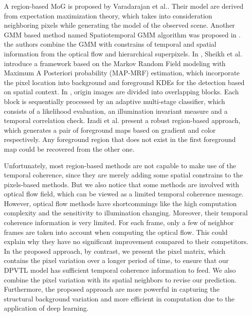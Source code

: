 \documentclass[journal]{IEEEtran}
\begin{document}
A region-based MoG is proposed by Varadarajan et al.\cite{2015_PR_Varadarajan20153488}. Their model are derived from expectation maximization theory, which takes into consideration neighboring pixels while generating the model of the observed scene.
%
Another GMM based method named Spatiotemporal GMM algorithm was proposed in \cite{2017_TPAMI_GANGWANG}. the authors combine the GMM with constrains of temporal and spatial information from the optical flow and hierarchical superpixels.
In \cite{Sheikh2005Bayesian}, Sheikh et al. introduce a framework based on the Markov Random Field modeling with Maximum A Posteriori 
probability (MAP-MRF) estimation, which incorporate the pixel location into background and foreground KDEs for the detection based on spatial context.
In \cite{Reddy2010Robust}, origin images are divided into overlapping blocks. Each block is sequentially processed by an adaptive multi-stage classifier, which consists of a likelihood evaluation, an illumination invariant measure and a temporal correlation check.
Izadi et al.\cite{Izadi2008Robust} present a robust region-based approach, which generates a pair of foreground maps based on gradient and color respectively. Any foreground region that does not exist in the first foreground map could be recovered from the other one.

Unfortunately, most region-based methods are not capable to make use of the temporal coherence, since they are merely adding some spatial constrains to the pixels-based methods. 
But we also notice that some methods are involved with optical flow field, which can be viewed as a limited temporal coherence message. 
However, optical flow methods have shortcommings like the high computation complexity and the sensitivity to illumination changing. 
Moreover, their temporal coherence information is very limited. For each frame, only a few of neighbor frames are taken into account when computing the optical flow.
This could explain why they have no significant improvement compared to their competitors.    
In the proposed approach, by contrast, we present the pixel matrix, which contains the pixel variation over a longer period of time, to ensure that our DPVTL model has sufficient temporal coherence information to feed.
We also combine the pixel variation with its spatial neighbors to revise our prediction.
Furthermore, the proposed approach are more powerful in capturing the structural background variation and more efficient in computation due to the application of deep learning.
\end{document}
